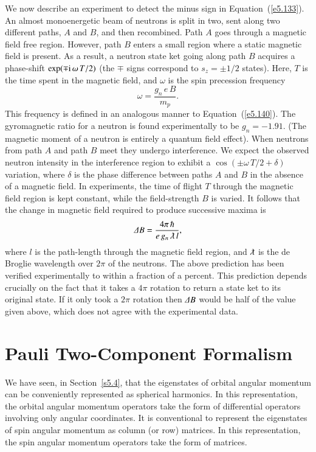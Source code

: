 We now describe an experiment to detect the minus sign in Equation~(\ref{e5.133}). An almost
 monoenergetic beam of neutrons is split in two, sent along two different
paths, $A$ and $B$, and then recombined. Path $A$ goes through a magnetic field
free region. However, path $B$ enters a small  region where a static magnetic
field is present. As a result, a neutron state ket going along path
$B$ acquires a phase-shift $\exp(\mp{\rm i}\, \omega \,T/2)$ (the $\mp$
signs correspond to $s_z = \pm 1/2$ states). Here, $T$ is the
time spent in the magnetic field, and $\omega$ is the spin precession frequency
\begin{equation}
\omega = \frac{g_n\, e\,B}{m_p}.
\end{equation}
This frequency is defined in an analogous manner to Equation~(\ref{e5.140}). The gyromagnetic
ratio for a neutron is found experimentally to be $g_n = -1.91$. 
(The magnetic moment of a neutron is entirely a quantum field effect).
When neutrons from path $A$ and path $B$ meet they undergo interference. We
expect the observed  neutron intensity in the interference region to
exhibit a $\cos( \pm \omega\, T/2 + \delta)$ variation, 
where $\delta$ is the phase difference 
between paths $A$ and $B$ in the absence of a magnetic field. In experiments,
the time of flight $T$ through the magnetic field region is kept constant, while
the field-strength $B$ is varied. It follows that the change in magnetic
field required to produce successive maxima is 
\begin{equation}
{\mit\Delta} B = \frac{4\pi \,\hbar}{e\, g_n\, \lambdabar\, l},
\end{equation}
where $l$ is the path-length through the magnetic field region, and $\lambdabar$
is the de Broglie wavelength over $2\pi$ of the neutrons. The above prediction has been verified
experimentally to within a fraction of a percent. This prediction depends crucially
on the fact that it takes a $4\pi$ rotation to return a state ket to its
original state. If it only took a $2\pi$ rotation then ${\mit\Delta} B$ would be half
of the value given above, which does not agree with the experimental data. 

\section{Pauli Two-Component Formalism}\label{spauli}
We have seen, in Section~\ref{s5.4}, that the eigenstates of orbital angular momentum
can be conveniently represented as spherical harmonics. In this
representation, the orbital  angular momentum 
operators take the form of  differential operators involving only
angular coordinates. It is conventional to represent the eigenstates of spin
angular momentum as column (or row) matrices. In this representation,
the spin angular momentum operators take the form of matrices. 

